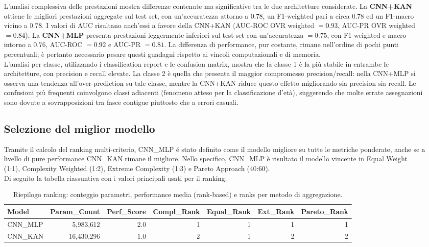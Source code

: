 \documentclass[a4paper,12pt]{report}
\begin{document}
	L'analisi complessiva delle prestazioni mostra differenze contenute ma significative tra le due architetture considerate. La \textbf{CNN+KAN} ottiene le migliori prestazioni aggregate sul test set, con un'accuratezza attorno a $0.78$, un F1-weighted pari a circa $0.78$ ed un F1-macro vicino a $0.78$. I valori di AUC risultano anch'essi a favore della CNN+KAN (AUC-ROC OVR weighted $= 0.93$, AUC-PR OVR weighted $= 0.84$). La \textbf{CNN+MLP} presenta prestazioni leggermente inferiori sul test set con un'accuratezza $= 0.75$, con F1-weighted e macro intorno a $0.76$, AUC-ROC $= 0.92$ e AUC-PR $= 0.81$. La differenza di performance, pur costante, rimane nell'ordine di pochi punti percentuali; è pertanto necessario pesare questi guadagni rispetto ai vincoli computazionali e di memoria. \\
	L'analisi per classe, utilizzando i classification report e le confusion matrix, mostra che la classe 1 è la più stabile in entrambe le architetture, con precision e recall elevate. La classe 2 è quella che presenta il maggior compromesso precision/recall: nella CNN+MLP si osserva una tendenza all'over-prediction su tale classe, mentre la CNN+KAN riduce questo effetto migliorando sia precision sia recall. Le confusioni più frequenti coinvolgono classi adiacenti (fenomeno atteso per la classificazione d'età), suggerendo che molte errate assegnazioni sono dovute a sovrapposizioni tra fasce contigue piuttosto che a errori casuali. \\
	
	\subsection{Selezione del miglior modello}
	Tramite il calcolo del ranking multi-criterio, CNN\_MLP é stato definito come il modello migliore su tutte le metriche ponderate, anche se a livello di pure performance CNN\_KAN rimane il migliore. Nello specifico, CNN\_MLP è risultato il modello vincente in Equal Weight (1:1), Complexity Weighted (1:2), Extreme Complexity (1:3) e Pareto Approach (40:60). \\
	Di seguito la tabella riassuntiva con i valori principali usati per il ranking:
	
	\begin{table}[H]
		\centering
		\setlength{\tabcolsep}{2pt}
		\caption{Riepilogo ranking: conteggio parametri, performance media (rank-based) e ranks per metodo di aggregazione.}
		\begin{tabular}{lrrrrrr}
			\toprule
			\textbf{Model} & \textbf{Param\_Count} & \textbf{Perf\_Score} & \textbf{Compl\_Rank} & \textbf{Equal\_Rank} & \textbf{Ext\_Rank} & \textbf{Pareto\_Rank} \\
			\midrule
			CNN\_MLP & 5,983,612 & 2.0 & 1 & 1 & 1 & 1 \\
			CNN\_KAN & 16,430,296 & 1.0 & 2 & 1 & 2 & 2 \\
			\bottomrule
		\end{tabular}
	\end{table}
	
\end{document}
